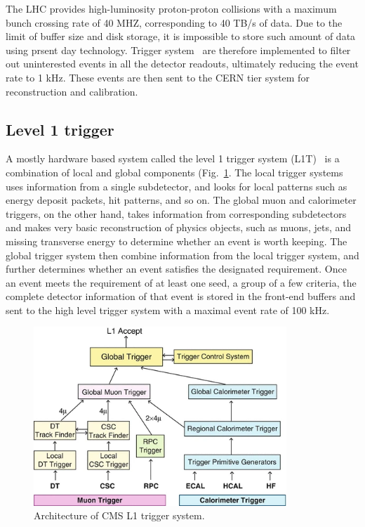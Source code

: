 The LHC provides high-luminosity proton-proton collisions with a maximum bunch crossing rate of 40 MHZ, corresponding to 40 TB/s of data.
Due to the limit of buffer size and disk storage, it is impossible to store such amount of data using prsent day technology.
Trigger system~\cite{Khachatryan:2016bia} are therefore implemented to filter out uninterested events in all the detector readouts, ultimately reducing the event rate to 1 kHz. 
These events are then sent to the CERN tier system for reconstruction and calibration.

\subsection{Level 1 trigger}
A mostly hardware based system called the level 1 trigger system (L1T)~\cite{CMS:2020cmk} is a combination of local and global components (Fig.~\ref{fig:cms_l1t}.
The local trigger systems uses information from a single subdetector, and looks for local patterns such as energy deposit packets, hit patterns, and so on.
The global muon and calorimeter triggers, on the other hand, takes information from corresponding subdetectors and makes very basic reconstruction of physics objects, such as muons, jets, and missing transverse energy to determine whether an event is worth keeping.
The global trigger system then combine information from the local trigger system, and further determines whether an event satisfies the designated requirement.
Once an event meets the requirement of at least one seed, a group of a few criteria, the complete detector information of that event is stored in the front-end buffers and sent to the high level trigger system with a maximal event rate of 100  kHz.

\begin{figure}\centering
    \includegraphics[width=0.85\textwidth]{figure/cms_l1t.png}
    \caption{Architecture of CMS L1 trigger system.}
    \label{fig:cms_l1t}
\end{figure}

